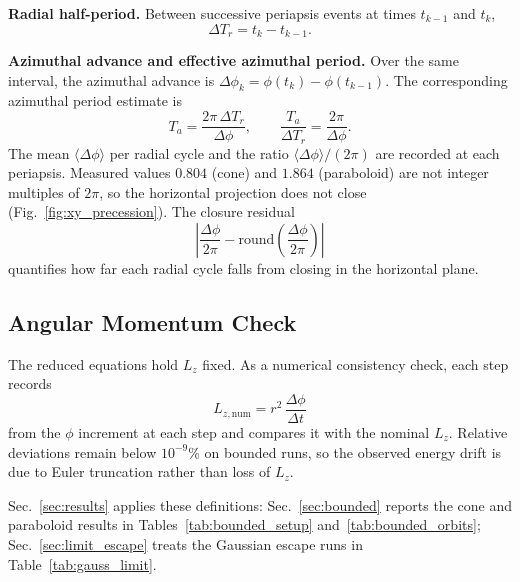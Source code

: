\documentclass[11pt,letterpaper]{article}
\newcommand{\parhead}[1]{\par\medskip\noindent\textbf{#1}\ignorespaces}
\begin{document}
\parhead{Radial half-period.}
Between successive periapsis events at times $t_{k-1}$ and $t_k$,
\begin{equation}\label{eq:Tr_num}
    \Delta T_r = t_k - t_{k-1}.
\end{equation}

\parhead{Azimuthal advance and effective azimuthal period.}
Over the same interval, the azimuthal advance is $\Delta\phi_k = \phi(t_k)-\phi(t_{k-1})$. The corresponding azimuthal period estimate is
\begin{equation}\label{eq:Ta_num}
    T_a = \frac{2\pi\,\Delta T_r}{\Delta\phi},
    \qquad
    \frac{T_a}{\Delta T_r} = \frac{2\pi}{\Delta\phi}.
\end{equation}
The mean $\langle\Delta\phi\rangle$ per radial cycle and the ratio $\langle\Delta\phi\rangle/(2\pi)$ are recorded at each periapsis. Measured values $0.804$ (cone) and $1.864$ (paraboloid) are not integer multiples of $2\pi$, so the horizontal projection does not close (Fig.~\ref{fig:xy_precession}). The closure residual
\begin{equation}\label{eq:closure_residual}
    \left|\frac{\Delta\phi}{2\pi} - \mathrm{round}\!\left(\frac{\Delta\phi}{2\pi}\right)\right|
\end{equation}
quantifies how far each radial cycle falls from closing in the horizontal plane.

\subsection{Angular Momentum Check}
\label{sec:analysis_Lzcheck}

The reduced equations hold $L_z$ fixed. As a numerical consistency check, each step records
\begin{equation}\label{eq:Lz_num}
    L_{z,\mathrm{num}} = r^2\,\frac{\Delta\phi}{\Delta t}
\end{equation}
from the $\phi$ increment at each step and compares it with the nominal $L_z$. Relative deviations remain below $10^{-9}\%$ on bounded runs, so the observed energy drift is due to Euler truncation rather than loss of $L_z$.

Sec.~\ref{sec:results} applies these definitions: Sec.~\ref{sec:bounded} reports the cone and paraboloid results in Tables~\ref{tab:bounded_setup} and~\ref{tab:bounded_orbits}; Sec.~\ref{sec:limit_escape} treats the Gaussian escape runs in Table~\ref{tab:gauss_limit}.

\end{document}
